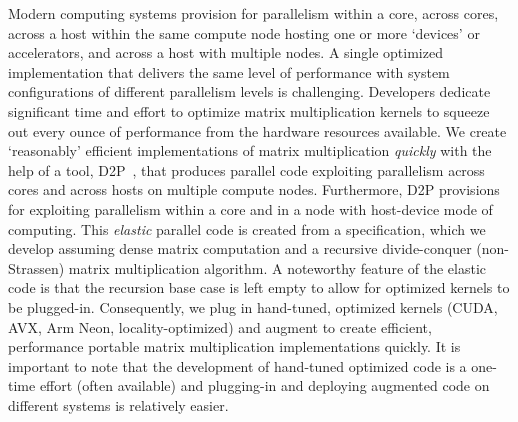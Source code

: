 Modern computing systems provision for parallelism within a core, across cores, across a host within the same compute node hosting one or more `devices' or accelerators, and across a host with multiple nodes. A single optimized implementation that delivers the same level of performance with system configurations of different parallelism levels is challenging.  Developers dedicate significant time and effort to optimize matrix multiplication kernels to squeeze out every ounce of performance from the hardware resources available. We create `reasonably' efficient implementations of matrix multiplication {\em quickly} with the help of a tool, D2P~\cite{hegde2019d2p}, that produces parallel code exploiting parallelism across cores and across hosts on multiple compute nodes. Furthermore, D2P provisions for exploiting parallelism within a core and in a node with host-device mode of computing. This {\em elastic} parallel code is created from a specification, which we develop assuming dense matrix computation and a recursive divide-conquer (non-Strassen) matrix multiplication algorithm. A noteworthy feature of the elastic code is that the recursion base case is left empty to allow for optimized kernels to be plugged-in. Consequently, we plug in hand-tuned, optimized kernels (CUDA, AVX, Arm Neon, locality-optimized) and augment to create efficient, performance portable matrix multiplication implementations quickly. It is important to note that the development of hand-tuned optimized code is a one-time effort (often available) and 
 plugging-in and deploying augmented code on different systems is relatively easier.

 

